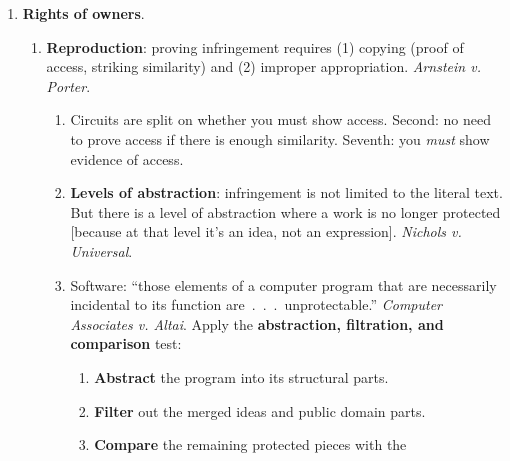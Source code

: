 \begin{enumerate}
\begin{enumerate}
\begin{enumerate}
\begin{enumerate}
                copyright interests that they had licensed. (But most 
                licensees insisted on advance assignment.)
                \item 1976 Act: eliminated the renewal requirement. Copyright 
                holders could terminate transfers of copyright between the 
                thirty-fifth and fortieth year from the execution of the 
                transfer.  Congress wanted to give stronger rights to authors 
                and their families.  This violates freedom of contract, but it 
                compensates for publishers' ``unequal bargaining 
                power.''\footnote{Casebook p. 533.}
            \end{enumerate}
        \end{enumerate}
    \end{enumerate}
    \item \textbf{Rights of owners}.
    \begin{enumerate}
        \item \textbf{Reproduction}: proving infringement requires (1) copying 
        (proof of access, striking similarity) and (2) improper appropriation. 
        \emph{Arnstein v. Porter}.
        \begin{enumerate}
            \item Circuits are split on whether you must show access. Second: 
            no need to prove access if there is enough similarity. Seventh: 
            you \emph{must} show evidence of access.
            \item \textbf{Levels of abstraction}: infringement is not limited 
            to the literal text. But there is a level of abstraction where a 
            work is no longer protected [because at that level it's an idea, 
            not an expression]. \emph{Nichols v. Universal}.
            \item Software: ``those elements of a computer program that are 
            necessarily incidental to its function are~.~.~.~unprotectable.'' 
            \emph{Computer Associates v. Altai}. Apply the 
            \textbf{abstraction, filtration, and comparison} test:
            \begin{enumerate}
                \item \textbf{Abstract} the program into its structural parts.
                \item \textbf{Filter} out the merged ideas and public domain 
                parts.
                \item \textbf{Compare} the remaining protected pieces with the 

\end{enumerate}
\end{enumerate}
\end{enumerate}
\end{enumerate}
